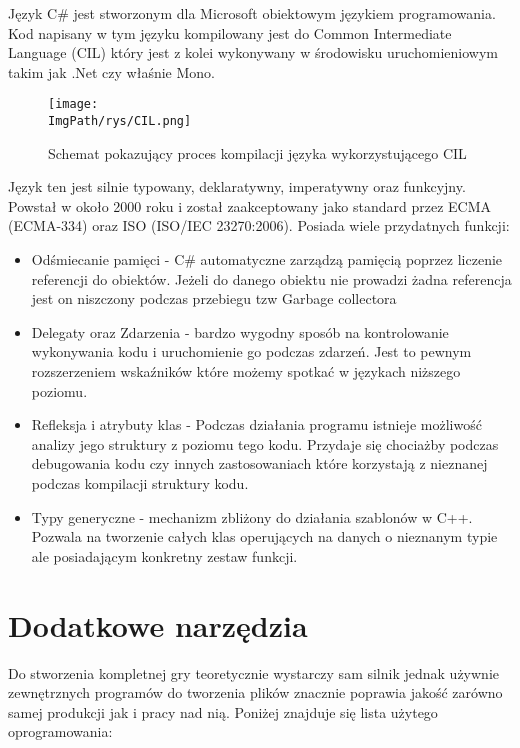 \documentclass[a4paper,12pt,twoside,openany]{report}
\newcommand{\ImgPath}{.}
\begin{document}
Język C\# jest stworzonym dla Microsoft obiektowym językiem programowania. Kod napisany w tym języku kompilowany jest do Common Intermediate Language (CIL) który jest z kolei wykonywany w środowisku uruchomieniowym  takim jak .Net czy właśnie Mono.  


\begin{figure}[!htbp]
	\begin{center}
\centering
\texttt{[image: \\ImgPath/rys/CIL.png]}
\end{center}
	\caption{Schemat pokazujący proces kompilacji języka wykorzystującego CIL}
	\label{CIL}
\end{figure}

Język ten jest silnie typowany, deklaratywny, imperatywny oraz funkcyjny. Powstał w około 2000 roku i został zaakceptowany jako standard przez ECMA (ECMA-334) oraz ISO (ISO/IEC 23270:2006). Posiada wiele przydatnych funkcji:
\begin{itemize}
    \item Odśmiecanie pamięci - C\# automatyczne zarządzą pamięcią poprzez liczenie referencji do obiektów. Jeżeli do danego obiektu nie prowadzi żadna referencja jest on niszczony podczas przebiegu tzw Garbage collectora
    \item Delegaty oraz Zdarzenia - bardzo wygodny sposób na kontrolowanie wykonywania kodu i uruchomienie go podczas zdarzeń. Jest to pewnym rozszerzeniem wskaźników które możemy spotkać w językach niższego poziomu.
    \item Refleksja i atrybuty klas - Podczas działania programu istnieje możliwość analizy jego struktury z poziomu tego kodu. Przydaje się chociażby podczas debugowania kodu czy innych zastosowaniach które korzystają z nieznanej podczas kompilacji struktury kodu.
    \item Typy generyczne - mechanizm zbliżony do działania szablonów w C++. Pozwala na tworzenie całych klas operujących na danych o nieznanym typie ale posiadającym konkretny zestaw funkcji.
\end{itemize}

\section{Dodatkowe narzędzia}
Do stworzenia kompletnej gry teoretycznie wystarczy sam silnik jednak używnie zewnętrznych programów do tworzenia plików znacznie poprawia jakość zarówno samej produkcji jak i pracy nad nią. Poniżej znajduje się lista użytego oprogramowania:
\end{document}
